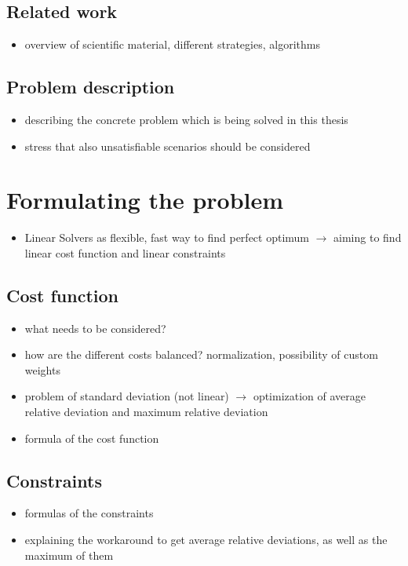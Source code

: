 \documentclass[]{article}
\begin{document}
\subsection{Related work}
\begin{itemize}
	\item overview of scientific material, different strategies, algorithms
\end{itemize}

\subsection{Problem description}
\begin{itemize}
	\item describing the concrete problem which is being solved in this thesis
	\item stress that also unsatisfiable scenarios should be considered
\end{itemize}

\section{Formulating the problem}
\begin{itemize}
	\item Linear Solvers as flexible, fast way to find perfect optimum $\rightarrow$ aiming to find linear cost function and linear constraints
\end{itemize}



\subsection{Cost function}
\begin{itemize}
	\item what needs to be considered?
	\item how are the different costs balanced?  normalization, possibility of custom weights
	\item problem of standard deviation (not linear) $\rightarrow$ optimization of average relative deviation and maximum relative deviation
	\item formula of the cost function
\end{itemize}

\subsection{Constraints}
\begin{itemize}
	\item formulas of the constraints
	\item explaining the workaround to get average relative deviations, as well as the maximum of them
\end{itemize}
\end{document}
